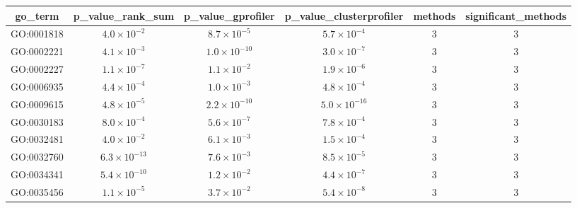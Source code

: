 \documentclass[11pt]{article}
\begin{document}
	\begin{center}
		\begin{tabular}{|c|c|c|c|c|c|}
			\hline
			go\_term & p\_value\_rank\_sum & p\_value\_gprofiler & p\_value\_clusterprofiler & methods & significant\_methods \\
			\hline
			GO:0001818 & $4.0 \times 10^{-2}$ & $8.7 \times 10^{-5}$ & $5.7 \times 10^{-4}$ & 3 & 3 \\
			GO:0002221 & $4.1 \times 10^{-3}$ & $1.0 \times 10^{-10}$ & $3.0 \times 10^{-7}$ & 3 & 3 \\
			GO:0002227 & $1.1 \times 10^{-7}$ & $1.1 \times 10^{-2}$ & $1.9 \times 10^{-6}$ & 3 & 3 \\
			GO:0006935 & $4.4 \times 10^{-4}$ & $1.0 \times 10^{-3}$ & $4.8 \times 10^{-4}$ & 3 & 3 \\
			GO:0009615 & $4.8 \times 10^{-5}$ & $2.2 \times 10^{-10}$ & $5.0 \times 10^{-16}$ & 3 & 3 \\
			GO:0030183 & $8.0 \times 10^{-4}$ & $5.6 \times 10^{-7}$ & $7.8 \times 10^{-4}$ & 3 & 3 \\
			GO:0032481 & $4.0 \times 10^{-2}$ & $6.1 \times 10^{-3}$ & $1.5 \times 10^{-4}$ & 3 & 3 \\
			GO:0032760 & $6.3 \times 10^{-13}$ & $7.6 \times 10^{-3}$ & $8.5 \times 10^{-5}$ & 3 & 3 \\
			GO:0034341 & $5.4 \times 10^{-10}$ & $1.2 \times 10^{-2}$ & $4.4 \times 10^{-7}$ & 3 & 3 \\
			GO:0035456 & $1.1 \times 10^{-5}$ & $3.7 \times 10^{-2}$ & $5.4 \times 10^{-8}$ & 3 & 3 \\
			\hline
		\end{tabular}
	\end{center}
	
\end{document}
